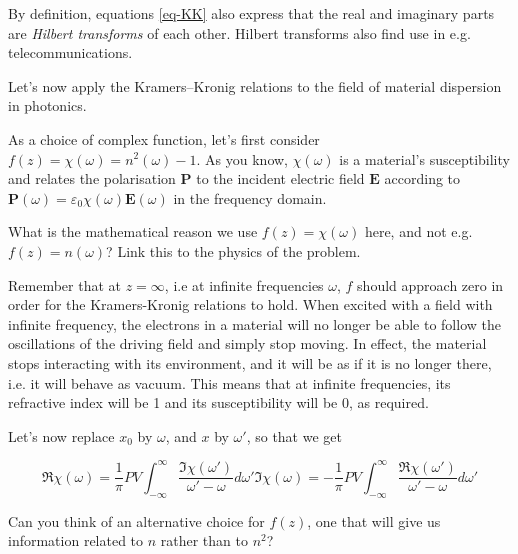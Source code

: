 By definition, equations \ref{eq-KK} also express that the real and imaginary parts are \emph{Hilbert transforms} of each other. Hilbert transforms also find use in e.g. telecommunications.


\pagebreak


Let's now apply the Kramers--Kronig relations to the field of material dispersion in photonics.

As a choice of complex function, let's first consider $f(z) = \chi(\omega) =
n^2(\omega) -1$. As you know, $\chi(\omega)$ is a material's susceptibility and relates the polarisation $\mathbf{P}$ to the incident electric field $\mathbf{E}$ according to $\mathbf{P}(\omega)=\varepsilon_0 \chi(\omega) \mathbf{E}(\omega)$ in the frequency domain.

\begin{cue}
What is the mathematical reason we use $f(z) = \chi(\omega)$ here, and not e.g. $f(z) = n(\omega)$? Link this to the physics of the problem. 
\end{cue}

Remember that at $z=\infty$, i.e at infinite frequencies $\omega$, $f$ should approach zero in order for the Kramers-Kronig relations to hold. When excited with a field with infinite frequency, the electrons in a material will no longer be able to follow the oscillations of the driving field and simply stop moving. In effect, the material stops interacting with its environment, and it will be as if it is no longer there, i.e. it will behave as vacuum. This means that at infinite frequencies, its refractive index will be 1 and its susceptibility will be 0, as required.

Let's now replace $x_0$ by $\omega$, and $x$ by $\omega'$, so that we get

\begin{subequations} 
\begin{equation}
\Re \chi(\omega) = \frac{1}{\pi} PV \int_{- \infty}^{\infty} \frac{\Im
\chi(\omega')}{\omega'-\omega}d\omega'
\end{equation} 
\begin{equation}
\Im \chi(\omega) = -\frac{1}{\pi} PV \int_{- \infty}^{\infty} \frac{\Re
\chi(\omega')}{\omega'-\omega}d\omega'
\end{equation}
\label{eq-KK-2}
\end{subequations}

\begin{cue}
Can you think of an alternative choice for $f(z)$, one that will give us information related to $n$ rather than to $n^2$?
\end{cue}

